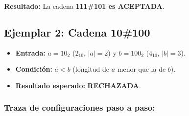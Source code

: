 \vspace{0.2cm}
\noindent\textbf{Resultado:} La cadena \textbf{111\#101 es ACEPTADA}.

\subsection*{Ejemplar 2: Cadena 10\#100}

\begin{itemize}[leftmargin=*]
    \item \textbf{Entrada:} $a = 10_2$ ($2_{10}$, $|a| = 2$) y $b = 100_2$ ($4_{10}$, $|b| = 3$).
    \item \textbf{Condición:} $a < b$ (longitud de $a$ menor que la de $b$).
    \item \textbf{Resultado esperado:} \textbf{RECHAZADA}.
\end{itemize}

\subsubsection*{Traza de configuraciones paso a paso:}

